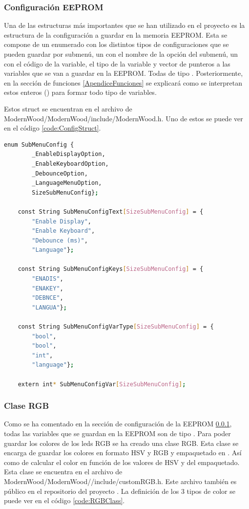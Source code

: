 \subsubsection{Configuración EEPROM} \label{ApendiceConfigEEPROM}
Una de las estructuras más importantes que se han utilizado en el proyecto es la estructura de la configuración a guardar en la memoria \gls{EEPROM}. Esta se compone de un enumerado con los distintos tipos de configuraciones que se pueden guardar por submenú, un  con el nombre de la opción del submenú, un  con el código de la variable, el tipo de la variable y vector de punteros a las variables que se van a guardar en la \gls{EEPROM}. Todas de tipo . Posteriormente, en la sección de funciones \ref{ApendiceFunciones} se explicará como se interpretan estos enteros () para formar todo tipo de variables.

Estos struct se encuentran en el archivo de ModernWood/ModernWood/include/ModernWood.h. Uno de estos se puede ver en el código \ref{code:ConfigStruct}.

\begin{lstlisting}[style=console, language=bash, caption={Primer Struct de configuración del teclado}, label={code:ConfigStruct}]
    enum SubMenuConfig {
        _EnableDisplayOption, 
        _EnableKeyboardOption, 
        _DebounceOption, 
        _LanguageMenuOption,
        SizeSubMenuConfig};

    const String SubMenuConfigText[SizeSubMenuConfig] = {
        "Enable Display", 
        "Enable Keyboard", 
        "Debounce (ms)", 
        "Language"};

    const String SubMenuConfigKeys[SizeSubMenuConfig] = {
        "ENADIS", 
        "ENAKEY", 
        "DEBNCE", 
        "LANGUA"};

    const String SubMenuConfigVarType[SizeSubMenuConfig] = {
        "bool", 
        "bool", 
        "int", 
        "language"};

    extern int* SubMenuConfigVar[SizeSubMenuConfig];
\end{lstlisting}

\subsubsection{Clase RGB} \label{ApendiceClaseRGB}
Como se ha comentado en la sección de configuración de la \gls{EEPROM} \ref{ApendiceConfigEEPROM}, todas las variables que se guardan en la \gls{EEPROM} son de tipo . Para poder guardar los colores de los leds RGB se ha creado una clase RGB. Esta clase se encarga de guardar los colores en formato HSV y RGB y empaquetado en . Así como de calcular el color en función de los valores de HSV y del empaquetado. Esta clase se encuentra en el archivo de ModernWood/ModernWood//include/customRGB.h. Este archivo también es público en el repositorio del proyecto \cite{ModernWoodGitHub}. La definición de los 3 tipos de color se puede ver en el código \ref{code:RGBClass}.

